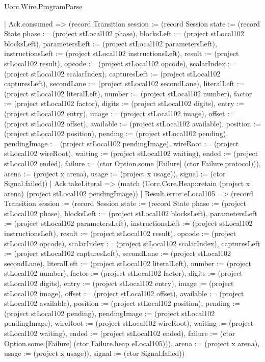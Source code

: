 \begin{lexlean}{Uorc.Wire.ProgramParse}
\begin{semanticmodule}
{        | Ack.consumed => (record Transition {session := (record Session {state := (record State {phase := (project stLocal102 phase), blocksLeft := (project stLocal102 blocksLeft), parametersLeft := (project stLocal102 parametersLeft), instructionsLeft := (project stLocal102 instructionsLeft), result := (project stLocal102 result), opcode := (project stLocal102 opcode), scalarIndex := (project stLocal102 scalarIndex), capturesLeft := (project stLocal102 capturesLeft), secondLane := (project stLocal102 secondLane), literalLeft := (project stLocal102 literalLeft), number := (project stLocal102 number), factor := (project stLocal102 factor), digits := (project stLocal102 digits), entry := (project stLocal102 entry), image := (project stLocal102 image), offset := (project stLocal102 offset), available := (project stLocal102 available), position := (project stLocal102 position), pending := (project stLocal102 pending), pendingImage := (project stLocal102 pendingImage), wireRoot := (project stLocal102 wireRoot), waiting := (project stLocal102 waiting), ended := (project stLocal102 ended), failure := (ctor Option.some [Failure] (ctor Failure.protocol))}), arena := (project x arena), usage := (project x usage)}), signal := (ctor Signal.failed)})
        | Ack.takeLiteral => (match (Uorc.Core.Heap::retain (project x arena) (project stLocal102 pendingImage))
          | Result.error eLocal105 => (record Transition {session := (record Session {state := (record State {phase := (project stLocal102 phase), blocksLeft := (project stLocal102 blocksLeft), parametersLeft := (project stLocal102 parametersLeft), instructionsLeft := (project stLocal102 instructionsLeft), result := (project stLocal102 result), opcode := (project stLocal102 opcode), scalarIndex := (project stLocal102 scalarIndex), capturesLeft := (project stLocal102 capturesLeft), secondLane := (project stLocal102 secondLane), literalLeft := (project stLocal102 literalLeft), number := (project stLocal102 number), factor := (project stLocal102 factor), digits := (project stLocal102 digits), entry := (project stLocal102 entry), image := (project stLocal102 image), offset := (project stLocal102 offset), available := (project stLocal102 available), position := (project stLocal102 position), pending := (project stLocal102 pending), pendingImage := (project stLocal102 pendingImage), wireRoot := (project stLocal102 wireRoot), waiting := (project stLocal102 waiting), ended := (project stLocal102 ended), failure := (ctor Option.some [Failure] (ctor Failure.heap eLocal105))}), arena := (project x arena), usage := (project x usage)}), signal := (ctor Signal.failed)})
}
\end{semanticmodule}
\end{lexlean}
